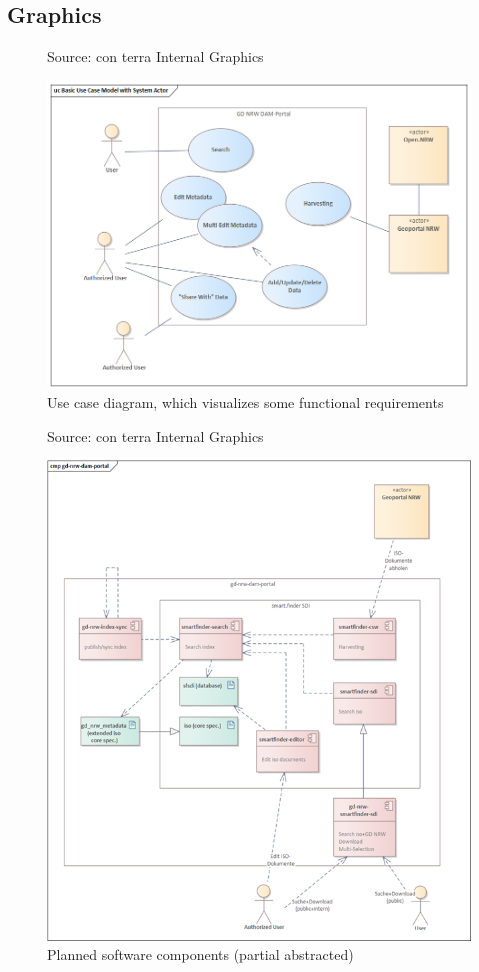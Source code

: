 \documentclass[11pt, titlepage, a4paper]{article}
\newcommand{\source}[1]{\caption*{Source: {#1}} }
\begin{document}
\begin{appendices}
    \section{Graphics}
    \begin{figure}[H]
        \caption{Use case diagram, which visualizes some functional requirements}
        \source{con terra Internal Graphics \cite{conterraGDNRWMetaDAMPort2024}}
        \label{fig:usecase}
        \includegraphics[width=16cm]{usecase_diagramm.png}
        \centering
    \end{figure}
    \begin{figure}[H]
        \caption{Planned software components (partial abstracted)}
        \source{con terra Internal Graphics \cite{conterraGDNRWMetaDAMPort2024}}
        \label{fig:components}
        \includegraphics[width=16cm]{components_.png}
        \centering
    \end{figure}


\end{appendices}
\end{document}
